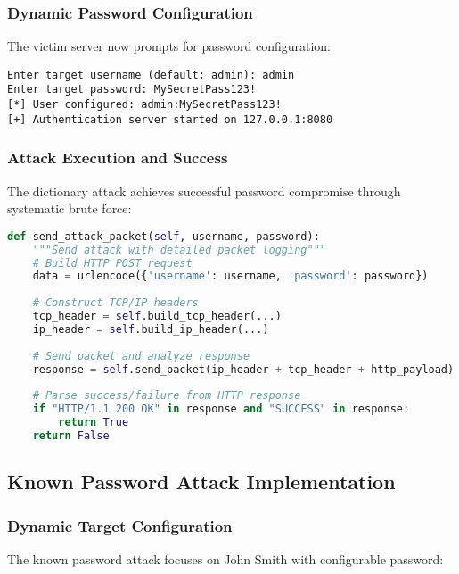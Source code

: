 \documentclass[12pt,a4paper]{article}
\begin{document}
\subsubsection{Dynamic Password Configuration}

The victim server now prompts for password configuration:

\begin{lstlisting}[caption=Dynamic Password Setup]
Enter target username (default: admin): admin
Enter target password: MySecretPass123!
[*] User configured: admin:MySecretPass123!
[+] Authentication server started on 127.0.0.1:8080
\end{lstlisting}

\subsubsection{Attack Execution and Success}

The dictionary attack achieves successful password compromise through systematic brute force:

\begin{lstlisting}[language=Python, caption=Key Implementation Functions]
def send_attack_packet(self, username, password):
    """Send attack with detailed packet logging"""
    # Build HTTP POST request
    data = urlencode({'username': username, 'password': password})
    
    # Construct TCP/IP headers
    tcp_header = self.build_tcp_header(...)
    ip_header = self.build_ip_header(...)
    
    # Send packet and analyze response
    response = self.send_packet(ip_header + tcp_header + http_payload)
    
    # Parse success/failure from HTTP response
    if "HTTP/1.1 200 OK" in response and "SUCCESS" in response:
        return True
    return False
\end{lstlisting}

\subsection{Known Password Attack Implementation}

\subsubsection{Dynamic Target Configuration}

The known password attack focuses on John Smith with configurable password:
\end{document}
